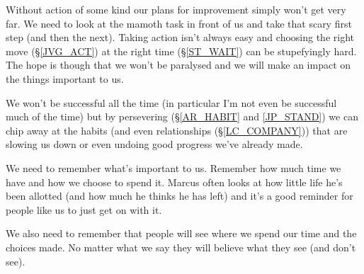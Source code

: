 \cleardoublepage
\begin{multicols}{2}

Without action of some kind our plans for improvement simply won't get very far. We need to look at the mamoth task in front of us and take that scary first step (and then the next). 
Taking action isn't always easy and choosing the right move (\S \ref{JVG_ACT}) at the right time (\S \ref{ST_WAIT}) can be stupefyingly hard.
The hope is though that we won't be paralysed and we will make an impact on the things important to us.

We won't be successful all the time (in particular I'm not even be successful much of the time) but by persevering (\S \ref{AR_HABIT} and \ref{JP_STAND}) we can chip away at the habits (and even relationships (\S \ref{LC_COMPANY})) that are slowing us down or even undoing good progress we've already made.

We need to remember what's important to us. Remember how much time we have and how we choose to spend it. Marcus often looks at how little life he's been allotted (and how much he thinks he has left) and it's a good reminder for people like us to just get on with it.

We also need to remember that people will see where we spend our time and the choices made. No matter what we say they will believe what they see (and don't see). 

\end{multicols}
\clearpage
